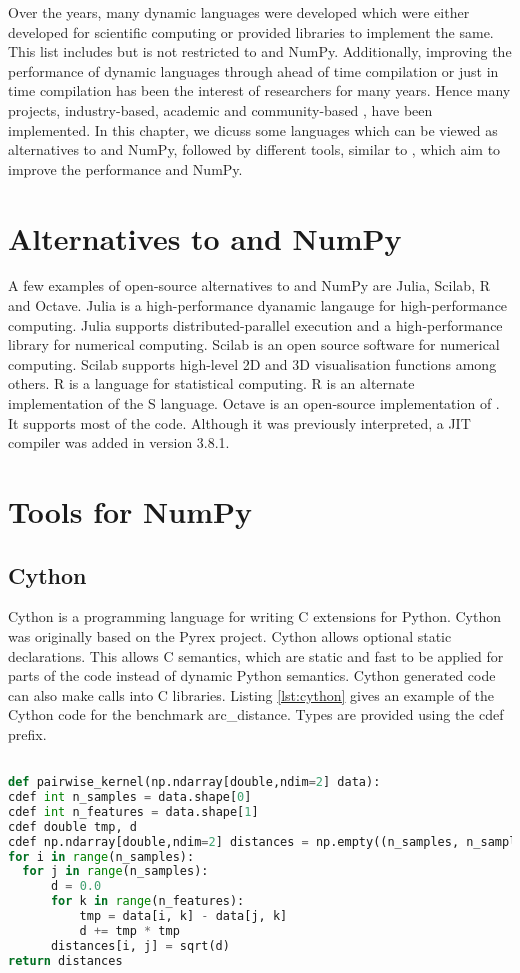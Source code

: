 Over the years, many dynamic languages were developed which were either developed for scientific computing or provided libraries to implement the same. This list includes but is not restricted to \matlab\cite{matlab} and NumPy\cite{numpy}. Additionally, improving the performance of dynamic languages through ahead of time compilation or just in time compilation has been the interest of researchers for many years. Hence many projects, industry-based, academic and community-based , have been implemented. In this chapter, we dicuss some languages which can be viewed as alternatives to \matlab and NumPy, followed by different tools, similar to \velocty, which aim to improve the performance \matlab and NumPy.
\section{Alternatives to \matlab and NumPy}
A few examples of open-source alternatives to \matlab and NumPy are Julia\cite{julia}, Scilab\cite{scilab}, R\cite{rlang} and Octave\cite{octave}. Julia is a high-performance dyanamic langauge for high-performance computing. Julia supports distributed-parallel execution and a high-performance library for numerical computing. Scilab is an open source software for numerical computing. Scilab supports high-level 2D and 3D visualisation functions among others. R is a language for statistical computing. R is an alternate implementation of the S language. Octave is an open-source implementation of \matlab. It supports most of the \matlab code. Although it was previously interpreted, a JIT compiler was added in version 3.8.1.
\section{Tools for NumPy}
\subsection{Cython}
Cython is a programming language for writing C extensions for Python. Cython was originally based on the Pyrex project\cite{pyrex}.  Cython allows optional static declarations. This allows C semantics, which are static and fast to be applied for parts of the code instead of dynamic Python semantics. Cython generated code can also make calls into C libraries. Listing \ref{lst:cython} gives an example of the Cython code for the benchmark arc\_distance. Types are provided using the \textsf{cdef} prefix. 

\begin{lstlisting}[language=python, label={lst:cython}, caption={ The Cython code with static type annotations that is taken as input by Cython to generate C code. The example is of the arc\_distance benchmark}]

def pairwise_kernel(np.ndarray[double,ndim=2] data):
cdef int n_samples = data.shape[0]
cdef int n_features = data.shape[1]
cdef double tmp, d
cdef np.ndarray[double,ndim=2] distances = np.empty((n_samples, n_samples))
for i in range(n_samples):
  for j in range(n_samples):
	  d = 0.0
	  for k in range(n_features):
		  tmp = data[i, k] - data[j, k]
		  d += tmp * tmp
	  distances[i, j] = sqrt(d)
return distances
\end{lstlisting}

